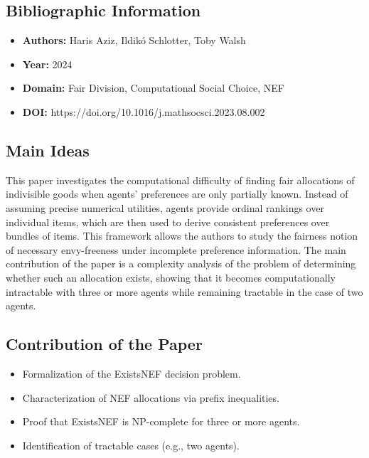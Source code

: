 \documentclass[12pt,a4paper]{article}
\begin{document}
\subsection*{Bibliographic Information}
\begin{itemize}
    \item \textbf{Authors:} Haris Aziz, Ildikó Schlotter, Toby Walsh
    \item \textbf{Year:} 2024
    \item \textbf{Domain:} Fair Division, Computational Social Choice, NEF
    \item \textbf{DOI:} https://doi.org/10.1016/j.mathsocsci.2023.08.002
\end{itemize}

\subsection*{Main Ideas}
\begin{tcolorbox}[colback=blue!5!white, colframe=blue!50!black]
This paper investigates the computational difficulty of finding fair allocations of indivisible goods when agents' preferences are only partially known. 
Instead of assuming precise numerical utilities, agents provide ordinal rankings over individual items, which are then used to derive consistent preferences over bundles of items. 
This framework allows the authors to study the fairness notion of necessary envy-freeness under incomplete preference information. 
The main contribution of the paper is a complexity analysis of the problem of determining whether such an allocation exists, showing that it becomes computationally intractable with three or more agents while remaining tractable in the case of two agents.
\end{tcolorbox}


\subsection*{Contribution of the Paper}

\begin{itemize}
\item Formalization of the ExistsNEF decision problem.
\item Characterization of NEF allocations via prefix inequalities.
\item Proof that ExistsNEF is NP-complete for three or more agents.
\item Identification of tractable cases (e.g., two agents).
\end{itemize}
\end{document}
